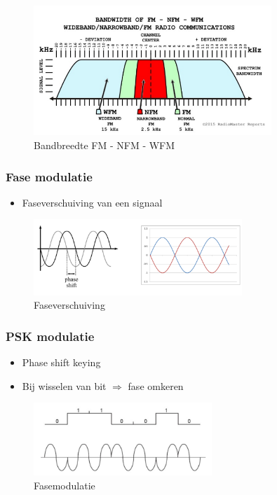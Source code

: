 \documentclass{article}
\begin{document}
\begin{figure}[H]
    \centering
    \includegraphics[width=0.8\textwidth]{Screenshot_20200302_121650.png}
    \caption{Bandbreedte FM - NFM - WFM}
\end{figure}

\subsubsection{Fase modulatie}
\begin{itemize}
    \item Faseverschuiving van een signaal
\end{itemize}

\begin{figure}[H]
    \centering
    \includegraphics[width=0.7\textwidth]{Screenshot_20200302_121855.png}
    \caption{Faseverschuiving}
\end{figure}

\subsubsection{PSK modulatie}
\begin{itemize}
    \item Phase shift keying
    \item Bij wisselen van bit $\Rightarrow$ fase omkeren
\end{itemize}

\begin{figure}[H]
    \centering
    \includegraphics[width=0.6\textwidth]{Screenshot_20200302_122031.png}
    \caption{Fasemodulatie}
\end{figure}
\end{document}
